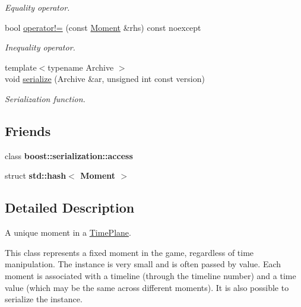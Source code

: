 \begin{DoxyCompactItemize}
\begin{DoxyCompactList}\small\item\em Equality operator. \end{DoxyCompactList}\item 
bool \hyperlink{classtimeplane_1_1_moment_a2e50bd80270c77f8d1b9fdbc586efc7c}{operator!=} (const \hyperlink{classtimeplane_1_1_moment}{Moment} \&rhs) const noexcept
\begin{DoxyCompactList}\small\item\em Inequality operator. \end{DoxyCompactList}\item 
{\footnotesize template$<$typename Archive $>$ }\\void \hyperlink{classtimeplane_1_1_moment_ac7870eb30ed18b8ea85bf7584632cd11}{serialize} (Archive \&ar, unsigned int const version)
\begin{DoxyCompactList}\small\item\em Serialization function. \end{DoxyCompactList}\end{DoxyCompactItemize}
\subsection*{Friends}
\begin{DoxyCompactItemize}
\item 
\mbox{\label{classtimeplane_1_1_moment_ac98d07dd8f7b70e16ccb9a01abf56b9c}} 
class {\bfseries boost\+::serialization\+::access}
\item 
\mbox{\label{classtimeplane_1_1_moment_a6000ec770baa14dc72ef269915ff4f6d}} 
struct {\bfseries std\+::hash$<$ Moment $>$}
\end{DoxyCompactItemize}


\subsection{Detailed Description}
A unique moment in a {\ttfamily \hyperlink{classtimeplane_1_1_time_plane}{Time\+Plane}}. 

This class represents a fixed moment in the game, regardless of time manipulation. The instance is very small and is often passed by value. Each moment is associated with a timeline (through the timeline number) and a time value (which may be the same across different moments). It is also possible to serialize the instance. 

